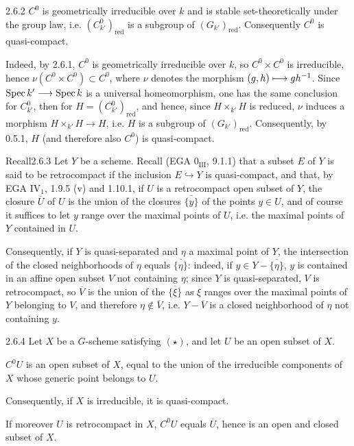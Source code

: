 \begin{corollary}{2.6.2}\label{VIA.2.6.2}
$C^0$ is geometrically irreducible over $k$ and is stable set-theoretically under the group law, i.e. $(C^0_{k'})_{\mathrm{red}}$ is a subgroup of $(G_{k'})_{\mathrm{red}}$. Consequently $C^0$ is quasi-compact.
\end{corollary}
Indeed, by 2.6.1, $C^0$ is geometrically irreducible over $k$, so $C^0\times C^0$ is irreducible, hence $\nu(C^0\times C^0)\subset C^0$, where $\nu$ denotes the morphism $(g,h)\longmapsto gh^{-1}$. Since $\operatorname{Spec} k'\longrightarrow\operatorname{Spec} k$ is a universal homeomorphism, one has the same conclusion for $C^0_{k'}$, then for $H=(C^0_{k'})_{\mathrm{red}}$, and hence, since $H\times_{k'}H$ is reduced, $\nu$ induces a morphism $H\times_{k'}H\to H$, i.e. $H$ is a subgroup of $(G_{k'})_{\mathrm{red}}$. Consequently, by 0.5.1, $H$ (and therefore also $C^0$) is quasi-compact.
\begin{enoncerm}{Recall}{2.6.3}\label{VIA.2.6.3}
Let $Y$ be a scheme. Recall (EGA $0_{\mathrm{III}}$, 9.1.1) that a subset $E$ of $Y$ is said to be retrocompact if the inclusion $E\hookrightarrow Y$ is quasi-compact, and that, by EGA IV$_1$, 1.9.5 (v) and 1.10.1, if $U$ is a retrocompact open subset of $Y$, the closure $\overline U$ of $U$ is the union of the closures $\overline{\{y\}}$ of the points $y\in U$, and of course it suffices to let $y$ range over the maximal points of $U$, i.e. the maximal points of $Y$ contained in $U$.

Consequently, if $Y$ is quasi-separated and $\eta$ a maximal point of $Y$, the intersection of the closed neighborhoods of $\eta$ equals $\overline{\{\eta\}}$: indeed, if $y\in Y-\overline{\{\eta\}}$, $y$ is contained in an affine open subset $V$ not containing $\eta$; since $Y$ is quasi-separated, $V$ is retrocompact, so $\overline V$ is the union of the $\overline{\{\xi\}}$ as $\xi$ ranges over the maximal points of $Y$ belonging to $V$, and therefore $\eta\notin\overline V$, i.e. $Y-\overline V$ is a closed neighborhood of $\eta$ not containing $y$.
\end{enoncerm}
\begin{proposition}{2.6.4}\label{VIA.2.6.4}
Let $X$ be a $G$-scheme satisfying $(\star)$, and let $U$ be an open subset of $X$.
\begin{enumeratei}
\item $C^0U$ is an open subset of $X$, equal to the union of the irreducible components of $X$ whose generic point belongs to $U$.
\item[(i')] Consequently, if $X$ is irreducible, it is quasi-compact.
\item If moreover $U$ is retrocompact in $X$, $C^0U$ equals $\overline U$, hence is an open and closed subset of $X$.
\end{enumeratei}
\end{proposition}
